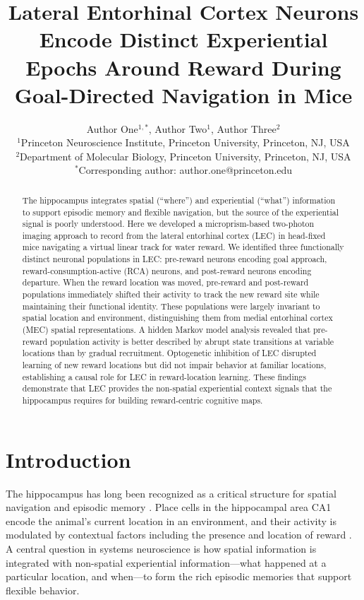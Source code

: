\documentclass[12pt]{article}
\title{Lateral Entorhinal Cortex Neurons Encode Distinct Experiential Epochs Around Reward During Goal-Directed Navigation in Mice}
\author{Author One$^{1,*}$, Author Two$^{1}$, Author Three$^{2}$ \\
\small $^1$Princeton Neuroscience Institute, Princeton University, Princeton, NJ, USA \\
\small $^2$Department of Molecular Biology, Princeton University, Princeton, NJ, USA \\
\small $^*$Corresponding author: author.one@princeton.edu}
\date{}
\begin{document}
\maketitle

\begin{abstract}
The hippocampus integrates spatial (``where'') and experiential (``what'') information to support episodic memory and flexible navigation, but the source of the experiential signal is poorly understood. Here we developed a microprism-based two-photon imaging approach to record from the lateral entorhinal cortex (LEC) in head-fixed mice navigating a virtual linear track for water reward. We identified three functionally distinct neuronal populations in LEC: pre-reward neurons encoding goal approach, reward-consumption-active (RCA) neurons, and post-reward neurons encoding departure. When the reward location was moved, pre-reward and post-reward populations immediately shifted their activity to track the new reward site while maintaining their functional identity. These populations were largely invariant to spatial location and environment, distinguishing them from medial entorhinal cortex (MEC) spatial representations. A hidden Markov model analysis revealed that pre-reward population activity is better described by abrupt state transitions at variable locations than by gradual recruitment. Optogenetic inhibition of LEC disrupted learning of new reward locations but did not impair behavior at familiar locations, establishing a causal role for LEC in reward-location learning. These findings demonstrate that LEC provides the non-spatial experiential context signals that the hippocampus requires for building reward-centric cognitive maps.
\end{abstract}

\section{Introduction}

The hippocampus has long been recognized as a critical structure for spatial navigation and episodic memory \citep{okeefe1971hippocampus}. Place cells in the hippocampal area CA1 encode the animal's current location in an environment, and their activity is modulated by contextual factors including the presence and location of reward \citep{dupret2010reorganization, gauthier2018dedicated}. A central question in systems neuroscience is how spatial information is integrated with non-spatial experiential information---what happened at a particular location, and when---to form the rich episodic memories that support flexible behavior.
\end{document}
